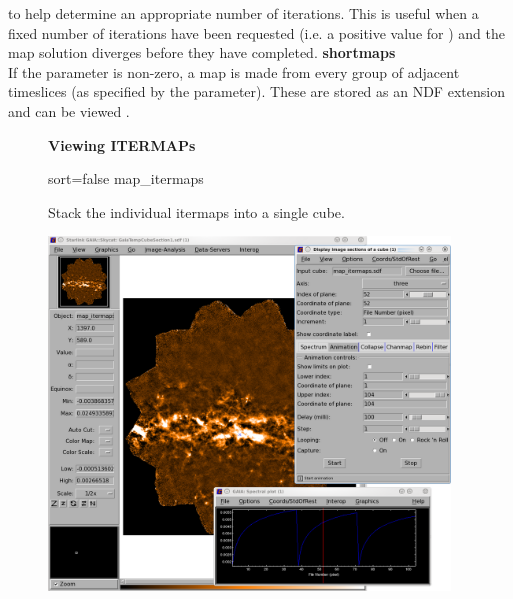 \documentclass[11pt,oneside,chapters]{starlink}
\begin{document}
\begin{terminalv}
\end{terminalv}
to help determine an appropriate number of iterations. This is useful
when a fixed number of iterations have been requested (i.e. a positive
value for ) and the map solution diverges before
they have completed.
\newline\newline
\textbf{shortmaps}\\
If the parameter  is non-zero, a map is made from
every group of adjacent timeslices (as specified by the parameter).
These are stored as an NDF extension and can be viewed \gaia.

\begin{latexonly}
\begin{figure}[ht!]
\begin{center}
\begin{fmpage}{0.95\linewidth}
\vspace{0.2cm}
\hspace{2mm}
\textbf{Viewing ITERMAPs}

\vspace{0.5cm}

\begin{minipage}[c]{0.65\linewidth}

\begin{terminalv}
sort=false map_itermaps
\end{terminalv}
\end{minipage}
\hspace{0.3cm}
\begin{minipage}[c]{0.29\linewidth}
Stack the individual itermaps into a single cube.
\end{minipage}

\vspace{0.5cm}

\begin{minipage}[c]{0.65\linewidth}
\centering
\includegraphics[width=0.95\textwidth]{sc21_itermaps_anim}


\end{minipage}
\end{fmpage}
\end{center}
\end{figure}
\end{latexonly}
\end{document}
